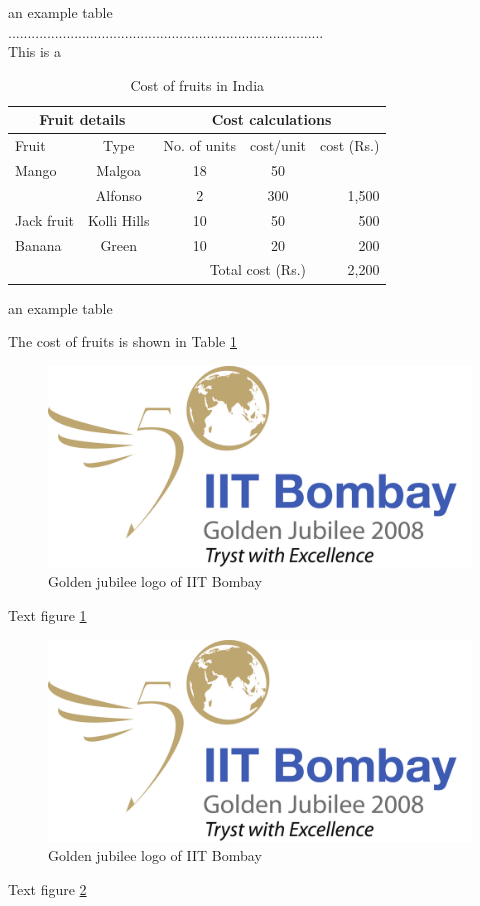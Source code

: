 \documentclass[12pt,a4paper]{article}
\begin{document}
an example table
\\.................................................................................\\
\newpage
This is a
\begin{table} 
\centering 
\caption{Cost of fruits in India} 
\label{tab:Fruits}
\vspace{1ex} 
\begin{tabular}{||l|c|c|c|r|}\hline
\multicolumn{2}{||c|}{Fruit details} & \multicolumn{3}{c|}{Cost calculations} \\ \hline
Fruit & Type & No. of units & cost/unit & cost (Rs.)\\ \hline
Mango & Malgoa & 18 & 50 & \\ \cline{2-4}
		 & Alfonso & 2 & 300 & 1,500 \\ \hline
Jack fruit & Kolli Hills & 10 & 50 & 500\\ \hline
Banana & Green & 10 & 20 & 200\\ \hline
\multicolumn{4}{||r|}{Total cost (Rs.)} & {2,200} \\ \hline
\end{tabular}
\end{table}
an example table

The cost of fruits is shown in Table \ref{tab:Fruits}

\newpage
\begin{figure}
\centering
\includegraphics[width=0.5\linewidth]{iitb} %
\caption{Golden jubilee logo of IIT Bombay}
\label{fig:golden}
\end{figure}

Text figure \ref{fig:golden}

\begin{figure}
\centering
\includegraphics[width=0.5\linewidth,angle=90]{iitb} %
\caption{Golden jubilee logo of IIT Bombay}
\label{fig:golden1}
\end{figure}
Text figure \ref{fig:golden1}
\end{document}
